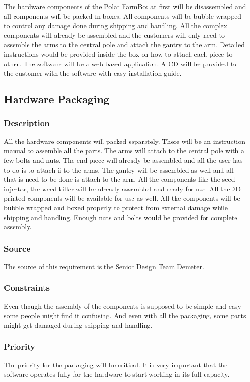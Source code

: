 The hardware components of the Polar FarmBot at first will be disassembled and all components will be packed in boxes. All components will be bubble wrapped to control any damage done during shipping and handling. All the complex components will already be assembled and the customers will only need to assemble the arms to the central pole and attach the gantry to the arm. Detailed instructions would be provided inside the box on how to attach each piece to other. The software will be a web based application. A CD will be provided to the customer with the software with easy installation guide.

\subsection{Hardware Packaging}
\subsubsection{Description}
All the hardware components will packed separately. There will be an instruction manual to assemble all the parts. The arms will attach to the central pole with a few bolts and nuts. The end piece will already be assembled and all the user has to do is to attach ii to the arms. The gantry will be assembled as well and all that is need to be done is attach to the arm. All the components like the seed injector, the weed killer will be already assembled and ready for use. All the 3D printed components will be available for use as well. All the components will be bubble wrapped and boxed properly to protect from external damage while shipping and handling. Enough nuts and bolts would be provided for complete assembly.
\subsubsection{Source}
The source of this requirement is the Senior Design Team Demeter.
\subsubsection{Constraints}
Even though the assembly of the components is supposed to be simple and easy some people might find it confusing. And even with all the packaging, some parts might get damaged during shipping and handling.
\subsubsection{Priority}
The priority for the packaging will be critical. It is very important that the software operates fully for the hardware to start working in its full capacity.

